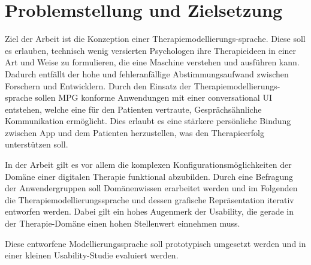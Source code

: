 





\section{Problemstellung und Zielsetzung}

Ziel der Arbeit ist die Konzeption einer Therapiemodellierungs-sprache. Diese soll es erlauben, technisch wenig versierten Psychologen ihre Therapieideen in einer Art und Weise zu formulieren, die eine Maschine verstehen und ausführen kann. Dadurch entfällt der hohe und fehleranfällige Abstimmungsaufwand zwischen Forschern und Entwicklern. Durch den Einsatz der Therapiemodellierungs-sprache sollen MPG konforme Anwendungen mit einer conversational UI entstehen, welche eine für den Patienten vertraute,  Gesprächsähnliche Kommunikation ermöglicht. Dies erlaubt es eine stärkere persönliche Bindung zwischen App und dem Patienten herzustellen, was den Therapieerfolg unterstützen soll. 

In der Arbeit gilt es vor allem die komplexen Konfigurationsmöglichkeiten der Domäne einer digitalen Therapie funktional abzubilden. Durch eine Befragung der Anwendergruppen soll Domänenwissen erarbeitet werden und im Folgenden die Therapiemodellierungssprache und dessen grafische Repräsentation iterativ entworfen werden. Dabei gilt ein hohes Augenmerk der Usability, die gerade in der Therapie-Domäne einen hohen Stellenwert einnehmen muss.

Diese entworfene Modellierungssprache soll prototypisch umgesetzt werden und in einer kleinen Usability-Studie evaluiert werden.

